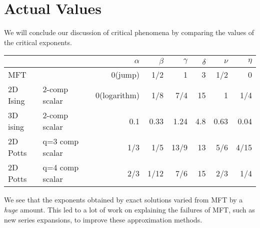 \section{Actual Values}
We will conclude our discussion of critical phenomena by comparing the values of the critical exponents.
\begin{center}
	\begin{tabular}{l|l|r|r|r|r|r|r}
		&&\(\alpha\) & \(\beta\) & \(\gamma\) & \(\delta\) & \(\nu\) & \(\eta\)\\
		\hline
		MFT && 0(jump) & 1/2 & 1 & 3 & 1/2 & 0\\
		2D Ising &2-comp scalar& 0(logarithm) & 1/8 & 7/4 & 15 & 1 & 1/4\\
		3D ising &2-comp scalar& 0.1 & 0.33 & 1.24 & 4.8 & 0.63 & 0.04\\
		2D Potts & q=3 comp scalar & 1/3 & 1/5 & 13/9 & 13 & 5/6 & 4/15\\
		2D Potts & q=4 comp scalar & 2/3 & 1/12 & 7/6 & 15 & 2/3 & 1/4
		
	\end{tabular}
\end{center}
We see that the exponents obtained by exact solutions varied from MFT by a \emph{huge} amount. This led to a lot of work on explaining the failures of MFT, such as new series expansions, to improve these approximation methods. 
